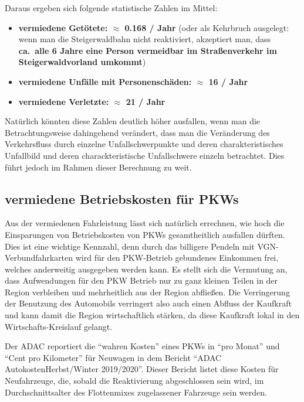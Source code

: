 \documentclass[fontsize=12pt,a4paper]{scrreprt}
\begin{document}
Daraus ergeben sich folgende statistische Zahlen im Mittel:

\begin{itemize}
        \item \textbf{vermiedene Getötete: \(\approx\) 0.168 / Jahr} (oder als Kehrbruch ausgelegt: wenn man die Steigerwaldbahn nicht reaktiviert, akzeptiert man, dass \textbf{ca.\ alle 6 Jahre eine Person vermeidbar im Straßenverkehr im Steigerwaldvorland umkommt})
        \item \textbf{vermiedene Unfälle mit Personenschäden: \(\approx\) 16 / Jahr}
        \item \textbf{vermiedene Verletzte: \(\approx\) 21 / Jahr}
\end{itemize}

Natürlich könnten diese Zahlen deutlich höher ausfallen, wenn man die Betrachtungsweise dahingehend verändert, dass man die Veränderung des Verkehrsfluss durch einzelne Unfallschwerpunkte und deren charakteristisches Unfallbild und deren charackteristische Unfallschwere einzeln betrachtet. Dies führt jedoch im Rahmen dieser Berechnung zu weit.

\subsection{vermiedene Betriebskosten für PKWs}
Aus der vermiedenen Fahrleistung lässt sich natürlich errechnen, wie hoch die Einsparungen von Betriebskosten von PKWs gesamtheitlich ausfallen dürften. Dies ist eine wichtige Kennzahl, denn durch das billigere Pendeln mit VGN-Verbundfahrkarten wird für den PKW-Betrieb gebundenes Einkommen frei, welches anderweitig ausgegeben werden kann. Es stellt sich die Vermutung an, dass Aufwendungen für den PKW Betrieb nur zu ganz kleinen Teilen in der Region verbleiben und mehrheitlich aus der Region abfließen. Die Verringerung der Benutzung des Automobils verringert also auch einen Abfluss der Kaufkraft und kann damit die Region wirtschaftlich stärken, da diese Kaufkraft lokal in den Wirtschafts-Kreislauf gelangt.

\vspace{1em}

Der ADAC reportiert die \enquote{wahren Kosten} eines PKWs in \enquote{pro Monat} und \enquote{Cent pro Kilometer} für Neuwagen in dem Bericht \enquote{ADAC AutokostenHerbst/Winter 2019/2020}. Dieser Bericht listet diese Kosten für Neufahrzeuge, die, sobald die Reaktivierung abgeschlossen sein wird, im Durchschnittsalter des Flottenmixes zugelassener Fahrzeuge sein werden.
\end{document}
